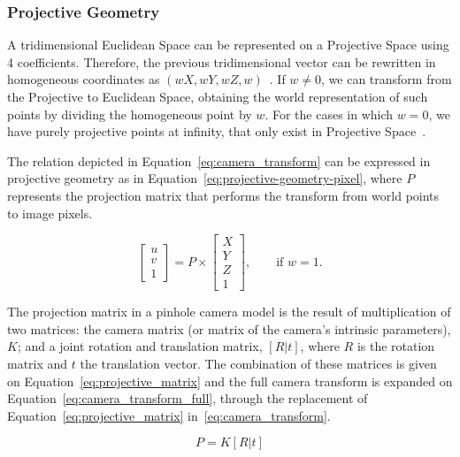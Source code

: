 \subsubsection{Projective Geometry}
A tridimensional Euclidean Space can be represented on a Projective Space using 4 coefficients. Therefore, the previous tridimensional vector can be rewritten in homogeneous coordinates as $(wX, wY, wZ, w)$~\cite{mvg_book}. If $w \neq 0$, we can transform from the Projective to Euclidean Space, obtaining the world representation of such points by dividing the homogeneous point by $w$. For the cases in which $w =  0$, we have purely projective points at infinity, that only exist in Projective Space~\cite{mvg_book}. 

The relation depicted in Equation~\eqref{eq:camera_transform} can be expressed in projective geometry as in Equation~\ref{eq:projective-geometry-pixel}, where $P$ represents the projection matrix that performs the transform from world points to image pixels. 

\begin{equation}
	\label{eq:projective-geometry-pixel}
	\begin{bmatrix}
		u \\ v \\ 1
	\end{bmatrix}
= P \times 
\begin{bmatrix}
		X \\ Y \\ Z \\ 1
\end{bmatrix}, \qquad \text{if } w = 1.
\end{equation}

The projection matrix in a pinhole camera model is the result of multiplication of two matrices: the camera matrix (or matrix of the camera's intrinsic parameters), $K$; and a joint rotation and translation matrix, $[R|t]$, where $R$ is the rotation matrix and $t$ the translation vector. The combination of these matrices is given on Equation~\eqref{eq:projective_matrix} and the full camera transform is expanded on Equation~\eqref{eq:camera_transform_full}, through the replacement of Equation~\eqref{eq:projective_matrix} in~\ref{eq:camera_transform}.

\begin{equation}
	\label{eq:projective_matrix}
	P = K[R|t]
\end{equation}

